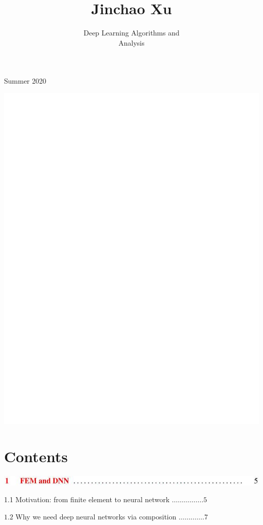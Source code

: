 \documentclass[10pt]{article}
\title{Jinchao Xu }
\author{Deep Learning Algorithms and\\
Analysis}
\date{}
\begin{document}
\maketitle

Summer 2020

\includegraphics[max width=\textwidth]{2022_01_05_e65f0d6bf0db4974ee45g-02}

\section{Contents}
\includegraphics[max width=\textwidth]{2022_01_05_e65f0d6bf0db4974ee45g-03}

1.1 Motivation: from finite element to neural network $\ldots \ldots \ldots \ldots \ldots .5$

$1.2$ Why we need deep neural networks via composition $\ldots \ldots \ldots \ldots .7$
\end{document}
